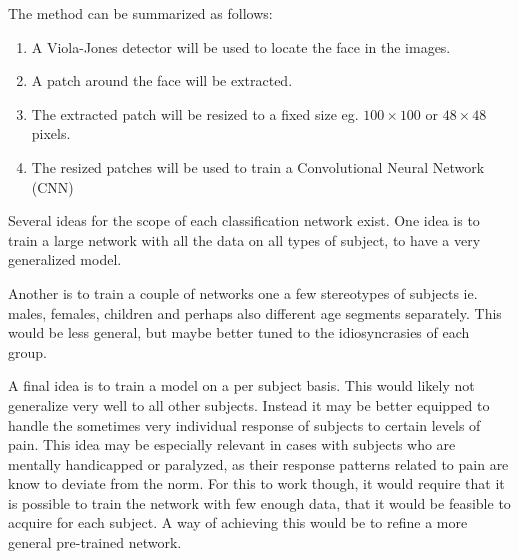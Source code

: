 \documentclass[Main]{subfiles}
\begin{document}
		The method can be summarized as follows:
		\begin{enumerate}
			\item 
			A Viola-Jones detector  will be used to locate the face in the images.
			
			\item 
			A patch around the face will be extracted.

			\item
			The extracted patch will be resized to a fixed size eg. $100 \times 100$ or $48 \times 48$ pixels.

			\item
			The resized patches will be used to train a Convolutional Neural Network (CNN)

		\end{enumerate}

		Several ideas for the scope of each classification network exist.
		One idea is to train a large network with all the data on all types of subject, to have a very generalized model.

		Another is to train a couple of networks one a few stereotypes of subjects ie. males, females, children and perhaps also different age segments separately. This would be less general, but maybe better tuned to the idiosyncrasies of each group.

		A final idea is to train a model on a per subject basis.
		This would likely not generalize very well to all other subjects.
		Instead it may be better equipped to handle the sometimes very individual response of subjects to certain levels of pain.
		This idea may be especially relevant in cases with subjects who are mentally handicapped or paralyzed, as their response patterns related to pain are know to deviate from the norm.
		For this to work though, it would require that it is possible to train the network with few enough data, that it would be feasible to acquire for each subject.
		A way of achieving this would be to refine a more general pre-trained network.


	
\end{document}
